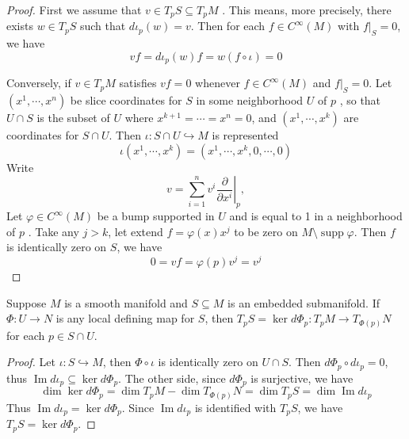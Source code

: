 \documentclass[../main.tex]{subfiles}
\begin{document}
\begin{proof}
    First we assume that \(  v\in T_{p}S  \subseteq T_{p}M\) . This means, more precisely, there exists \(  w\in T_{p}S  \) such that \(  d \iota _{p}\left( w \right)= v   \).   Then for each \(  f\in C^{\infty}\left( M \right)   \) with \(  f|_{S}= 0  \), we have \[
    vf= d \iota _{p}\left( w \right)f= w\left( f\circ \iota  \right) = 0 
    \]   

    Conversely, if \(  v\in T_{p}M  \) satisfies \(  vf= 0  \) whenever \(  f \in C^{\infty}\left( M \right)   \) and \(  f|_{S}= 0  \). Let \(  \left( x^{1},\cdots ,x^{n} \right)   \) be slice coordinates for \(  S  \) in some neighborhood \(  U  \) of \(  p  \) , so that \(  U\cap S  \) is the subset of \(  U  \) where \(  x^{k+ 1}= \cdots = x^{n}= 0  \), and  \(  \left( x^{1},\cdots ,x^{k} \right)   \)  are coordinates for \(  S  \cap U\). Then \(  \iota : S\cap U\hookrightarrow M \) is represented  \[
    \iota \left( x^{1},\cdots ,x^{k} \right)= \left( x^{1},\cdots ,x^{k},0,\cdots ,0 \right)  
    \] Write \[
    v= \sum _{i= 1}^{n}v^{i}\left. \frac{\partial }{\partial x^{i}} \right|_{p}, 
    \] Let \(   \varphi \in C^{\infty}\left( M \right)   \) be a bump   supported in \(  U  \) and is equal to 1 in a neighborhood of \(  p  \) . Take any \(  j> k  \), let extend \(  f=  \varphi \left( x \right)x^{j}   \) to be zero  on \(  M\setminus \operatorname{supp} \varphi   \). Then \(  f  \) is identically zero on \(  S  \), we have   \[
    0= vf=  \varphi \left( p \right)v^{j} = v^{j}
    \]
\end{proof}

\begin{proposition}{}{}
    Suppose \(  M  \) is a smooth manifold and \(  S\subseteq M  \) is an embedded submanifold. If \(  \Phi :U\to N  \) is any local defining map for \(  S  \), then \(  T_{p}S  = \operatorname{ker} d\Phi _{p}:T_{p}M \to T_{\Phi \left( p \right) }N\) for each \(  p\in S\cap U  \).       
\end{proposition}

\begin{proof}
    Let \(  \iota :S\hookrightarrow M  \), then \(  \Phi \circ \iota   \) is identically zero on \(  U\cap S  \). Then \(  d \Phi _{p} \circ d \iota _{p}= 0  \), thus \(  \operatorname{Im} d \iota _{p}\subseteq \operatorname{ker} d \Phi _{p} \). The other side, since \(  d \Phi _{p}  \) is surjective, we have \[
    \operatorname{dim} \operatorname{ker} d \Phi _{p}=  \operatorname{dim} T_p{M}- \operatorname{dim}T_{\Phi \left( p \right) }N= \operatorname{dim}T_{p}S= \operatorname{dim} \operatorname{Im} d \iota _{p}
    \]      Thus \(  \operatorname{Im} d \iota _{p}= \operatorname{ker} d \Phi _{p}  \). Since \(  \operatorname{Im}d \iota _{p}  \) is identified with \(  T_{p}S  \), we have \(  T_{p}S= \operatorname{ker}d \Phi _{p}  \).    
\end{proof}
\end{document}
